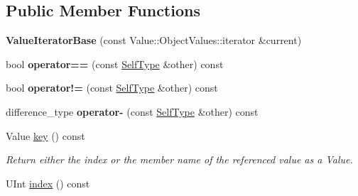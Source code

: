 \subsection*{Public Member Functions}
\begin{DoxyCompactItemize}
\item 
\hypertarget{class_json_1_1_value_iterator_base_a38e5d4351341621d69ec0647bebd6393}{{\bfseries Value\-Iterator\-Base} (const Value\-::\-Object\-Values\-::iterator \&current)}\label{class_json_1_1_value_iterator_base_a38e5d4351341621d69ec0647bebd6393}

\item 
\hypertarget{class_json_1_1_value_iterator_base_afc656672ac28502f640ade32c38c1b56}{bool {\bfseries operator==} (const \hyperlink{class_json_1_1_value_iterator_base}{Self\-Type} \&other) const }\label{class_json_1_1_value_iterator_base_afc656672ac28502f640ade32c38c1b56}

\item 
\hypertarget{class_json_1_1_value_iterator_base_a18c2dd42e0bb989ace141bfe9de52792}{bool {\bfseries operator!=} (const \hyperlink{class_json_1_1_value_iterator_base}{Self\-Type} \&other) const }\label{class_json_1_1_value_iterator_base_a18c2dd42e0bb989ace141bfe9de52792}

\item 
\hypertarget{class_json_1_1_value_iterator_base_ab786787fcad68ca5e8745aaf520fa17f}{difference\-\_\-type {\bfseries operator-\/} (const \hyperlink{class_json_1_1_value_iterator_base}{Self\-Type} \&other) const }\label{class_json_1_1_value_iterator_base_ab786787fcad68ca5e8745aaf520fa17f}

\item 
\hypertarget{class_json_1_1_value_iterator_base_a7fe8b45ba67da5f01dc54273242c5f46}{Value \hyperlink{class_json_1_1_value_iterator_base_a7fe8b45ba67da5f01dc54273242c5f46}{key} () const }\label{class_json_1_1_value_iterator_base_a7fe8b45ba67da5f01dc54273242c5f46}

\begin{DoxyCompactList}\small\item\em Return either the index or the member name of the referenced value as a Value. \end{DoxyCompactList}\item 
\hypertarget{class_json_1_1_value_iterator_base_a5671376c32cb0fb95cbe0934be3ea5af}{U\-Int \hyperlink{class_json_1_1_value_iterator_base_a5671376c32cb0fb95cbe0934be3ea5af}{index} () const }\label{class_json_1_1_value_iterator_base_a5671376c32cb0fb95cbe0934be3ea5af}


\end{DoxyCompactItemize}
